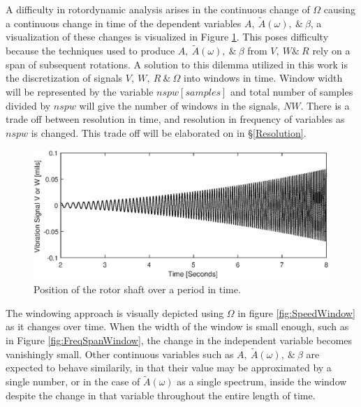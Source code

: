 A difficulty in rotordynamic analysis arises in the continuous change of $ \Omega $ causing a continuous change in time of the dependent variables $ A,\ \tilde{A}(\omega),\ \&\ \beta $, a visualization of these changes is visualized in Figure \ref{fig:PosOverTime}. This poses difficulty because the techniques used to produce $ A,\ \tilde{A}(\omega),\ \&\ \beta $ from $ V,\ W\&\ R $ rely on a span of subsequent rotations. A solution to this dilemma utilized in this work is the discretization of signals $ V,\ W,\ R\ \&\ \Omega $ into windows in time. Window width will be represented by the variable $ nspw[samples] $ and total number of samples divided by $ nspw $ will give the number of windows in the signals, $ NW $. There is a trade off between resolution in time, and resolution in frequency of variables as $ nspw $ is changed. This trade off will be elaborated on in \S\ref{Resolution}.\par 
\begin{figure}
	\centering
	\includegraphics[width=\linewidth]{./figures/Pos_Over_Time.eps}
	\caption{Position of the rotor shaft over a period in time.}
	\label{fig:PosOverTime}
\end{figure}
The windowing approach is visually depicted using $ \Omega $ in figure \ref{fig:SpeedWindow} as it changes over time. When the width of the window is small enough, such as in Figure \ref{fig:FreqSpanWindow}, the change in the independent variable becomes vanishingly small. Other continuous variables such as $ A,\ \tilde{A}(\omega),\ \&\ \beta $ are expected to behave similarily, in that their value may be approximated by a single number, or in the case of $ \tilde{A}(\omega) $ as a single spectrum, inside the window despite the change in that variable throughout the entire length of time.
